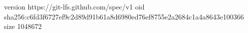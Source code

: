 version https://git-lfs.github.com/spec/v1
oid sha256:c6fd3f6727ef9c2d89d91b61a8d6980ed76ef8755e2a2684c1a4a8643e100366
size 1048672
